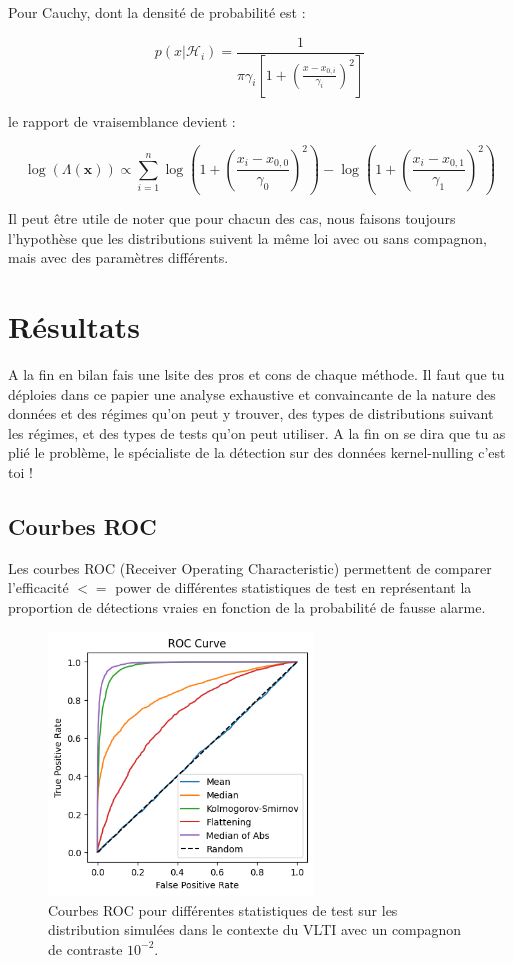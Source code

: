 \documentclass{article}
\newcommand{\dm}[1]{{\color{mulberry} #1}}
\begin{document}
Pour Cauchy, dont la densité de probabilité est :

\begin{equation}
    p(x|\mathcal{H}_i) = \frac{1}{\pi \gamma_i \left[1 + \left(\frac{x - x_{0,i}}{\gamma_i}\right)^2\right]}
\end{equation}

le rapport de vraisemblance devient :

\begin{equation}
    \log(\Lambda(\mathbf{x})) \propto \sum_{i=1}^{n} \log\left(1 + \left(\frac{x_i - x_{0,0}}{\gamma_0}\right)^2\right) - \log\left(1 + \left(\frac{x_i - x_{0,1}}{\gamma_1}\right)^2\right)
\end{equation}

Il peut être utile de noter que pour chacun des cas, nous faisons toujours l'hypothèse que les distributions suivent la même loi avec ou sans compagnon, mais avec des paramètres différents.

\section{Résultats}

\dm{A la fin en bilan fais une lsite des pros et cons de chaque méthode. Il faut que tu déploies dans ce papier une analyse exhaustive et convaincante de la nature des données et des régimes qu'on peut y trouver, des types de distributions suivant les régimes, et des types de tests qu'on peut utiliser. A la fin on se dira que tu as plié le problème, le spécialiste de la détection sur des données kernel-nulling c'est toi !  }
\subsection{Courbes ROC}

Les courbes ROC (Receiver Operating Characteristic) permettent de comparer l'efficacité \dm{$<=$ power } de différentes statistiques de test en représentant la proportion de détections vraies en fonction de la probabilité de fausse alarme.

\begin{figure}[H]
\centering
\includegraphics[width=7cm]{img/roc_curves.png}
\caption{Courbes ROC pour différentes statistiques de test sur les distribution simulées dans le contexte du VLTI avec un compagnon de contraste $10^{-2}$.}
\label{fig:roc}
\end{figure}
\end{document}
